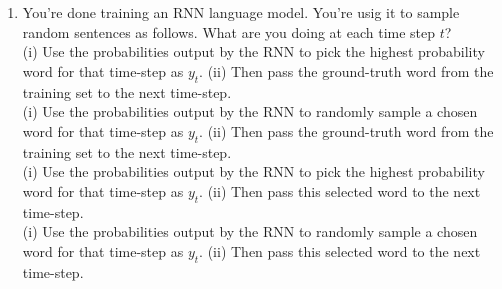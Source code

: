 \begin{enumerate}
    \item You're done training an RNN language model. You're usig it to sample random sentences as follows. What are you doing at each time step $t$? \\ 
        \hspace{1cm}\choice{}  (i) Use the probabilities output by the RNN to pick the highest probability word for that time-step as $y_t$. (ii) Then pass the ground-truth word from the training set to the next time-step. \\ 
        \hspace{1cm}\choice{}  (i) Use the probabilities output by the RNN to randomly sample a chosen word for that time-step as $y_t$. (ii) Then pass the ground-truth word from the training set to the next time-step. \\ 
        \hspace{1cm}\choice{}  (i) Use the probabilities output by the RNN to pick the highest probability word for that time-step as $y_t$. (ii) Then pass this selected word to the next time-step. \\ 
        \hspace{1cm}\checkmark{}  (i) Use the probabilities output by the RNN to randomly sample a chosen word for that time-step as $y_t$. (ii) Then pass this selected word to the next time-step.

        \solution{}


\end{enumerate}
